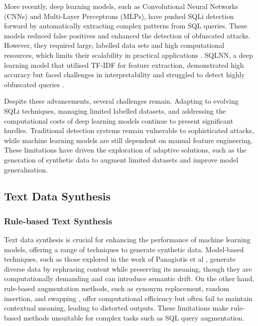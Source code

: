 \documentclass[journal]{IEEEtran}
\begin{document}
More recently, deep learning models, such as Convolutional Neural Networks (CNNs) and Multi-Layer Perceptrons (MLPs), have pushed SQLi detection forward by automatically extracting complex patterns from SQL queries. These models reduced false positives and enhanced the detection of obfuscated attacks. However, they required large, labelled data sets and high computational resources, which limits their scalability in practical applications \cite{hasan2019detection}. SQLNN, a deep learning model that utilised TF-IDF for feature extraction, demonstrated high accuracy but faced challenges in interpretability and struggled to detect highly obfuscated queries \cite{chen2021sql}.

Despite these advancements, several challenges remain. Adapting to evolving SQLi techniques, managing limited labelled datasets, and addressing the computational costs of deep learning models continue to present significant hurdles. Traditional detection systems remain vulnerable to sophisticated attacks, while machine learning models are still dependent on manual feature engineering. These limitations have driven the exploration of adaptive solutions, such as the generation of synthetic data to augment limited datasets and improve model generalisation.

\subsection{Text Data Synthesis}

\subsubsection{Rule-based Text Synthesis}
Text data synthesis is crucial for enhancing the performance of machine learning models, offering a range of techniques to generate synthetic data. Model-based techniques, such as those explored in the work of Panagiotis et al \cite{skondras2023generating}, generate diverse data by rephrasing content while preserving its meaning, though they are computationally demanding and can introduce semantic drift. On the other hand, rule-based augmentation methods, such as synonym replacement, random insertion, and swapping \cite{awan2022augmentation}, offer computational efficiency but often fail to maintain contextual meaning, leading to distorted outputs. These limitations make rule-based methods unsuitable for complex tasks such as SQL query augmentation.
\end{document}
